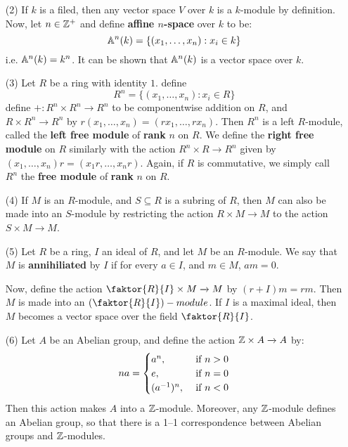 \begin{definition}
\begin{example}
\begin{enumerate}
    \item[(2)] If $k$ is a filed, then any vector space $V$ over $k$
      is a $k$-module by definition. Now, let $n \in \mathbb{Z}^+$ and define
      \textbf{affine $n$-space} over $k$ to be:
      \begin{equation*}
        \mathbb{A}^n(k)=\{(x_1, \dots, x_n) : x_i \in k\}
      \end{equation*}
      i.e. $\mathbb{A}^n(k)=k^n$. It can be shown that $\mathbb{A}^n(k)$ is a vector
      space over $k$.

    \item[(3)] Let $R$ be a ring with identity $1$. define
      \begin{equation*}
        R^n = \{(x_1, \dots, x_n) : x_i \in R\}
      \end{equation*}
      define $+:R^n \times R^n \xrightarrow{} R^n$ to be componentwise
      addition on $R$, and  $R \times R^n \xrightarrow{} R^n$ by
      $r(x_1, \dots, x_n)=(rx_1, \dots, rx_n)$. Then $R^n$ is a left
      $R$-module, called the \textbf{left free module} of
      \textbf{rank} $n$ on $R$. We define the \textbf{right free
      module} on $R$ similarly with the action $R^n \times R
      \xrightarrow{} R^n$ given by $(x_1, \dots, x_n)r=(x_1r, \dots,
      x_nr)$. Again, if $R$ is commutative, we simply call
      $R^n$ the \textbf{free module} of \textbf{rank} $n$ on $R$.

    \item[(4)] If $M$ is an $R$-module, and $S \subseteq R$ is a
      subring of $R$, then $M$ can also be made into an $S$-module by
      restricting the action $R \times M \xrightarrow{} M$ to the
      action $S \times M \xrightarrow{} M$.

    \item[(5)] Let $R$ be a ring,  $I$ an ideal of  $R$, and let  $M$
      be an $R$-module. We say that $M$ is \textbf{annihiliated} by
      $I$ if for every $a \in I$, and  $m \in M$, $am=0$.

      Now, define the action $\faktor{R}{I} \times M \xrightarrow{} M$
      by $(r+I)m=rm$. Then $M$ is made into an
      $(\faktor{R}{I})-module$. If $I$ is a maximal ideal, then  $M$
      becomes a vector space over the field  $\faktor{R}{I}$.

    \item[(6)] Let $A$ be an Abelian group, and define the action $\mathbb{Z}
      \times A \xrightarrow{} A$ by:
      \begin{equation*}
        na=
        \begin{cases}
          a^n,  & \text{ if } n>0  \\
          e,    & \text{ if } n=0  \\
          (a^{-1}) ^n, & \text{ if } n<0 \\
        \end{cases}
      \end{equation*}
      Then this action makes $A$ into a $\mathbb{Z}$-module. Moreover, any
      $\mathbb{Z}$-module defines an Abelian group, so that there is a 1--1
      correspondence between Abelian groups and $\mathbb{Z}$-modules.


\end{enumerate}
\end{example}
\end{definition}
